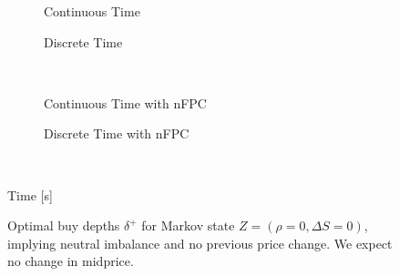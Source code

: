 \begin{figure}%
\centering%
\begin{subfigure}[b]{.4\linewidth}%
  \setlength\figureheight{\linewidth}%
  \setlength\figurewidth{\linewidth}%
  \caption{Continuous Time}%
\end{subfigure}%
\hspace{1.5cm}%
\begin{subfigure}[b]{.4\linewidth}%
  \setlength\figureheight{\linewidth}%
  \setlength\figurewidth{\linewidth}%
  \caption{Discrete Time}%
\end{subfigure}\\%
\vspace{1cm}%
\begin{subfigure}[b]{.4\linewidth}%
  \setlength\figureheight{\linewidth}%
  \setlength\figurewidth{\linewidth}%
  \caption{Continuous Time with nFPC}%
\end{subfigure}%
\hspace{1.5cm}%
\begin{subfigure}[b]{.4\linewidth}%
  \setlength\figureheight{\linewidth}%
  \setlength\figurewidth{\linewidth}%
  \caption{Discrete Time with nFPC}%
\end{subfigure}\\%
%
\leavevmode{}\hspace{0pt plus 1filll}\null%

Time [s]

\vspace{1cm}%
\begin{subfigure}{\linewidth}%
  \centering%
\end{subfigure}%
  \caption[Optimal buy LO depths for neutral imbalance]{Optimal buy depths $\delta^+$ for Markov state $Z=(\rho = 0, \Delta S = 0)$, implying neutral imbalance and no previous price change. We expect no change in midprice.}\label{fig:comp_dp_z8}%
\end{figure}
